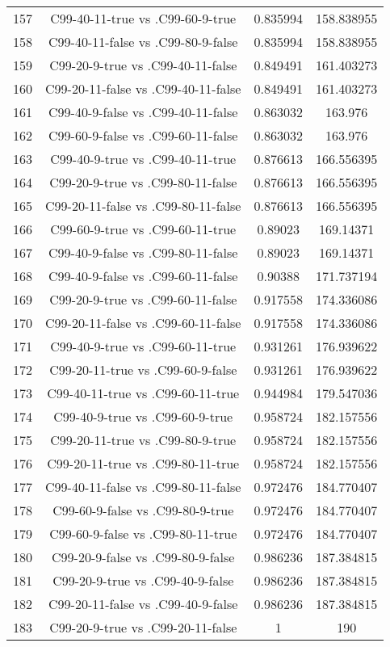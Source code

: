 \documentclass[a4paper,10pt]{article}
\begin{document}
\begin{landscape}
\begin{table}[!htp]
\begin{tabular}{cccc}
157&C99-40-11-true vs .C99-60-9-true&0.835994&158.838955\\
158&C99-40-11-false vs .C99-80-9-false&0.835994&158.838955\\
159&C99-20-9-true vs .C99-40-11-false&0.849491&161.403273\\
160&C99-20-11-false vs .C99-40-11-false&0.849491&161.403273\\
161&C99-40-9-false vs .C99-40-11-false&0.863032&163.976\\
162&C99-60-9-false vs .C99-60-11-false&0.863032&163.976\\
163&C99-40-9-true vs .C99-40-11-true&0.876613&166.556395\\
164&C99-20-9-true vs .C99-80-11-false&0.876613&166.556395\\
165&C99-20-11-false vs .C99-80-11-false&0.876613&166.556395\\
166&C99-60-9-true vs .C99-60-11-true&0.89023&169.14371\\
167&C99-40-9-false vs .C99-80-11-false&0.89023&169.14371\\
168&C99-40-9-false vs .C99-60-11-false&0.90388&171.737194\\
169&C99-20-9-true vs .C99-60-11-false&0.917558&174.336086\\
170&C99-20-11-false vs .C99-60-11-false&0.917558&174.336086\\
171&C99-40-9-true vs .C99-60-11-true&0.931261&176.939622\\
172&C99-20-11-true vs .C99-60-9-false&0.931261&176.939622\\
173&C99-40-11-true vs .C99-60-11-true&0.944984&179.547036\\
174&C99-40-9-true vs .C99-60-9-true&0.958724&182.157556\\
175&C99-20-11-true vs .C99-80-9-true&0.958724&182.157556\\
176&C99-20-11-true vs .C99-80-11-true&0.958724&182.157556\\
177&C99-40-11-false vs .C99-80-11-false&0.972476&184.770407\\
178&C99-60-9-false vs .C99-80-9-true&0.972476&184.770407\\
179&C99-60-9-false vs .C99-80-11-true&0.972476&184.770407\\
180&C99-20-9-false vs .C99-80-9-false&0.986236&187.384815\\
181&C99-20-9-true vs .C99-40-9-false&0.986236&187.384815\\
182&C99-20-11-false vs .C99-40-9-false&0.986236&187.384815\\
183&C99-20-9-true vs .C99-20-11-false&1&190\\

\end{tabular}
\end{table}
\end{landscape}
\end{document}
